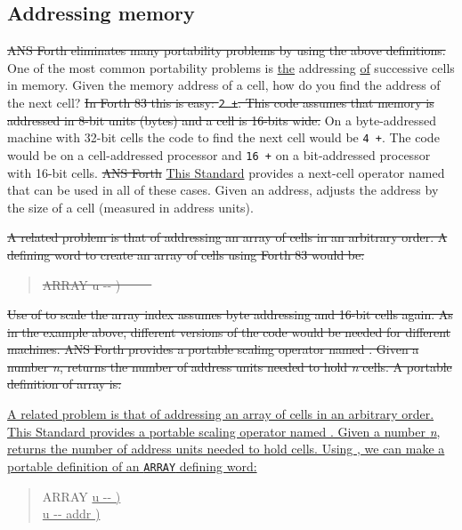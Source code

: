 \subsection{Addressing memory} %

\sout{ANS Forth eliminates many portability problems by using the above
definitions.}
One of the most common portability problems is \uline{the} addressing \uline{of} 
successive cells in memory. Given the memory address of a cell, how
do you find the address of the next cell? 
\sout{In Forth 83 this is easy:
\texttt{2 +}. This code assumes that memory is addressed in 8-bit
units (bytes) and a cell is 16-bits wide.}
On a byte-addressed machine
with 32-bit cells the code to find the next cell would be \texttt{4 +}.
The code would be  on a cell-addressed processor and
\texttt{16 +} on a bit-addressed processor with 16-bit cells.
\sout{ANS Forth} \uline{This Standard} provides a
next-cell operator named  that can be used in all of these cases.
Given an address,  adjusts the address by the size of a cell
(measured in address units).

\sout{A related problem is that of addressing an array of cells in an
arbitrary order. A defining word to create an array of cells using Forth 83 would be:}

\begin{quote}\ttfamily
	\sout{\word{:} ARRAY  u -{}- ) ~  ~   ~
		   \word{+} \word{;}}
\end{quote}

\sout{Use of  to scale the array index assumes byte addressing and
16-bit cells again. As in the example above, different versions of
the code would be needed for different machines. ANS Forth provides
a portable scaling operator named . Given a number \emph{n},
 returns the number of address units needed to hold \emph{n}
cells. A portable definition of array is:}

\uline{A related problem is that of addressing an array of cells in an
arbitrary order. This Standard provides a portable scaling operator named .
Given a number \emph{n},  returns the number of address
units needed to hold  cells.   Using , we can make
a portable definition of an \texttt{ARRAY} defining word:}

\begin{quote}\ttfamily
	\word{:} ARRAY \uline{ u -{}- )}  ~   \\
	\hspace*{2em} \uline{ u -{}- addr )}   \word{+} \word{;}
\end{quote}

